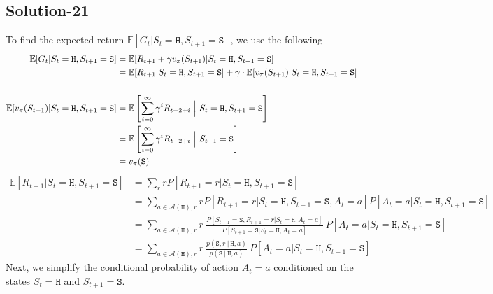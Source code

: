 \documentclass[11pt]{article}
\begin{document}
    \subsection*{Solution-21}
    To find the expected return $\mathbb{E}[G_{t} | S_{t} = \texttt{H}, S_{t+1} = \texttt{S}]$, we use the following
    \begin{align*}
        \mathbb{E}[G_{t} | S_{t} = \texttt{H}, S_{t+1} = \texttt{S}] &= \mathbb{E}[R_{t+1} + \gamma v_{\pi}(S_{t+1}) | S_{t} = \texttt{H}, S_{t+1} = \texttt{S}] \\
        &= \mathbb{E}[R_{t+1} | S_{t} = \texttt{H}, S_{t+1} = \texttt{S}] + \gamma \cdot \mathbb{E}[v_{\pi}(S_{t+1}) | S_{t} = \texttt{H}, S_{t+1} = \texttt{S}] \\
        \vspace*{0pt} \\
        \mathbb{E}[v_{\pi}(S_{t+1}) | S_{t} = \texttt{H}, S_{t+1} = \texttt{S}] &= \mathbb{E}\left[ \sum_{i=0}^{\infty} \gamma^{i} R_{t+2+i} \ \Big| \ S_{t} = \texttt{H}, S_{t+1} = \texttt{S} \right] \\
        &= \mathbb{E}\left[ \sum_{i=0}^{\infty} \gamma^{i} R_{t+2+i} \ \Big| \ S_{t+1} = \texttt{S} \right] \\
        &= v_{\pi}(\texttt{S})
    \end{align*}
    \begin{align*}
        \mathbb{E}[R_{t+1} | S_{t} = \texttt{H}, S_{t+1} = \texttt{S}] &= \sum_{r} r P[R_{t+1} = r | S_{t} = \texttt{H}, S_{t+1} = \texttt{S}] \\
        &= \sum_{a \in \mathcal{A}(\texttt{H}), r} r P[R_{t+1} = r | S_{t} = \texttt{H}, S_{t+1} = \texttt{S}, A_{t} = a] P[A_{t} = a | S_{t} = \texttt{H}, S_{t+1} = \texttt{S}] \\
        &= \sum_{a \in \mathcal{A}(\texttt{H}), r} r \ \frac{P[S_{t+1} = \texttt{S}, R_{t+1} = r | S_{t} = \texttt{H}, A_{t} = a]}{P[S_{t+1} = \texttt{S} | S_{t} = \texttt{H}, A_{t} = a]} \ P[A_{t} = a | S_{t} = \texttt{H}, S_{t+1} = \texttt{S}] \\
        &= \sum_{a \in \mathcal{A}(\texttt{H}), r} r \ \frac{p(\texttt{S}, r \ | \ \texttt{H}, a)}{p(\texttt{S} \ | \ \texttt{H}, a)} \ P[A_{t} = a | S_{t} = \texttt{H}, S_{t+1} = \texttt{S}]
    \end{align*}
    Next, we simplify the conditional probability of action $A_{t} = a$ conditioned on the states $S_{t} = \texttt{H}$ and $S_{t+1} = \texttt{S}$.
\end{document}
